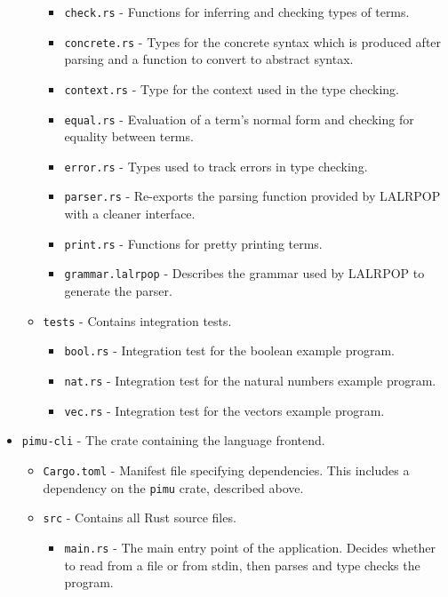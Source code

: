 \documentclass[12pt,a4paper,twoside]{report}
\begin{document}
\begin{itemize}
\begin{itemize}
\begin{itemize}
                        \item \texttt{check.rs} - Functions for inferring and checking types of terms.
                        \item \texttt{concrete.rs} - Types for the concrete syntax which is produced after parsing and a function to convert to abstract syntax.
                        \item \texttt{context.rs} - Type for the context used in the type checking.
                        \item \texttt{equal.rs} - Evaluation of a term's normal form and checking for equality between terms.
                        \item \texttt{error.rs} - Types used to track errors in type checking.
                        \item \texttt{parser.rs} - Re-exports the parsing function provided by LALRPOP with a cleaner interface.
                        \item \texttt{print.rs} - Functions for pretty printing terms.
                        \item \texttt{grammar.lalrpop} - Describes the grammar used by LALRPOP to generate the parser.
                    \end{itemize}
                \item \texttt{tests} - Contains integration tests.
          \begin{itemize}
            \item \texttt{bool.rs} - Integration test for the boolean example program.
            \item \texttt{nat.rs} - Integration test for the natural numbers example program.
            \item \texttt{vec.rs} - Integration test for the vectors example program.
          \end{itemize}
          \end{itemize}
    \item \texttt{pimu-cli} - The crate containing the language frontend.
          \begin{itemize}
              \item \texttt{Cargo.toml} - Manifest file specifying dependencies. This includes a dependency on the \texttt{pimu} crate, described above.
              \item \texttt{src} - Contains all Rust source files.
                    \begin{itemize}
                        \item \texttt{main.rs} - The main entry point of the application. Decides whether to read from a file or from stdin, then parses and type checks the program.

\end{itemize}
\end{itemize}
\end{itemize}
\end{document}
